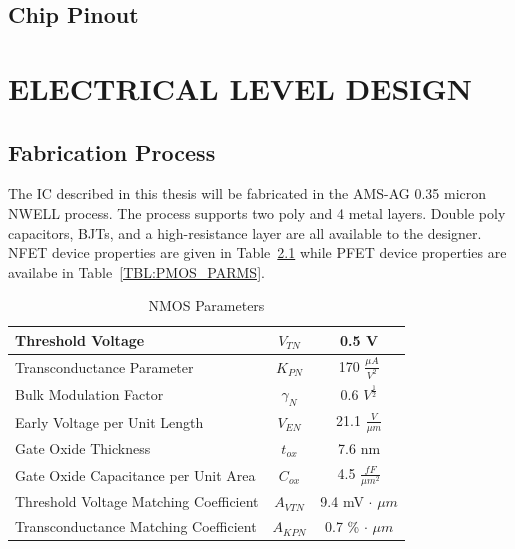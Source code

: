 \documentclass[12pt,oneside,final]{siuethesis}
\theoremstyle{definition}
\begin{document}
\section{Chip Pinout}



\chapter{ELECTRICAL LEVEL DESIGN}

\section{Fabrication Process}

The IC described in this thesis will be fabricated in the AMS-AG 0.35 micron NWELL process.  The process supports two poly and 4 metal layers. Double poly capacitors, BJTs, and a high-resistance layer are all available to the designer. NFET device properties are given in Table~\ref{TBL:NMOS_PARMS} while PFET device properties are availabe in Table~\ref{TBL:PMOS_PARMS}.


\begin{table} [htbp!]
\begin{center}
\begin{tabular}{| l | c | c |}
\hline 
Threshold Voltage & $V_{TN}$ & 0.5 V \\ 
\hline 
Transconductance Parameter & $K_{PN}$  &  170 $\frac{\mu A}{V^2}$ \\ 
\hline 
Bulk Modulation Factor & $\gamma_{N}$  &  0.6 $V^{\frac{1}{2}}$ \\ 
\hline 
Early Voltage per Unit Length & $V_{EN}$  &  21.1 $\frac{V}{\mu m}$ \\ 
\hline 
Gate Oxide Thickness & $t_{ox}$  &  7.6 nm \\ 
\hline 
Gate Oxide Capacitance per Unit Area & $C_{ox}$  & 4.5 $\frac{fF}{\mu m^2}$ \\ 
\hline 
Threshold Voltage Matching Coefficient & $A_{VTN}$  &  9.4 mV $\cdot$ $\mu m$ \\ 
\hline 
Transconductance Matching Coefficient & $A_{KPN}$  &  0.7 \% $\cdot$ $\mu m$ \\ 
\hline 
\end{tabular} 
\end{center}
\caption{NMOS Parameters}
\label{TBL:NMOS_PARMS}
\end{table}
\end{document}
